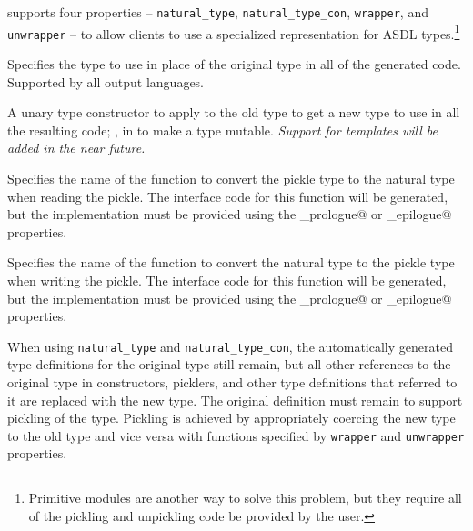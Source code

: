 \asdlgen{} supports four properties -- \lstinline!natural_type!,
\lstinline!natural_type_con!, \lstinline!wrapper!, and \lstinline!unwrapper! --
to allow clients to use a specialized representation for ASDL types.\footnote{
  Primitive modules are another way to solve this problem, but they require
  all of the pickling and unpickling code be provided by the user.
}
\begin{description}
    Specifies the type to use in place of the original type in all of the
    generated code.
    Supported by all output languages.

    A unary type constructor to apply to the old type to get a new type to
    use in all the resulting code; \eg{}, \lstinline@ref@ in \sml{} to make a type
    mutable.
    \emph{Support for \Cplusplus{} templates will be added in the near future.}

    Specifies the name of the function to convert the pickle type to the natural
    type when reading the pickle.  The interface code for this function will
    be generated, but the implementation must be provided using the
    \lstinline@implementation_prologue@ or \lstinline@implementation_epilogue@
    properties.

    Specifies the name of the function to convert the natural type to the pickle
    type when writing the pickle.  The interface code for this function will
    be generated, but the implementation must be provided using the
    \lstinline@implementation_prologue@ or \lstinline@implementation_epilogue@
    properties.
\end{description}%

When using \lstinline!natural_type! and \lstinline!natural_type_con!,
the automatically generated type definitions for the original type still
remain, but all other references to the original type in constructors, picklers,
and other type definitions that referred to it are replaced with the new type.
The original definition must remain to support pickling of the type. Pickling
is achieved by appropriately coercing the new type to the old type and vice
versa with functions specified by \lstinline!wrapper! and \lstinline!unwrapper!
properties.


